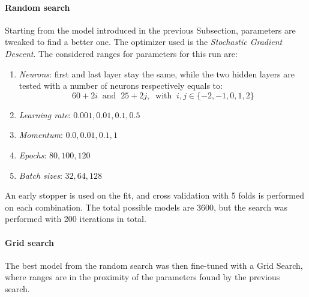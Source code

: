 \paragraph{Random search}
Starting from the model introduced in the previous Subsection, parameters are 
tweaked to find a better one.
The optimizer used is the \emph{Stochastic Gradient Descent}.
The considered ranges for parameters for this run are: 
\begin{enumerate}
    \item \emph{Neurons}: first and last layer stay the same, while 
    the two hidden layers are tested with a number of neurons respectively 
    equals to: 
    $$60 + 2i\;\;\text{and}\;\;25 + 2j,\;\;\text{with}\;\; i, j \in \{-2,-1,0,1,2\}$$
    \item \emph{Learning rate}: $0.001, 0.01, 0.1, 0.5$
    \item \emph{Momentum}: $0.0, 0.01, 0.1, 1$
    \item \emph{Epochs}: $80, 100, 120$
    \item \emph{Batch sizes}: $32, 64, 128$
\end{enumerate}

An early stopper is used on the fit, and cross validation with 5 folds is 
performed on each combination.
The total possible models are 3600, but the search was performed with 200 iterations
in total.

\paragraph{Grid search}
The best model from the random search was then fine-tuned with a Grid Search, 
where ranges are in the proximity of the parameters found by the previous search.